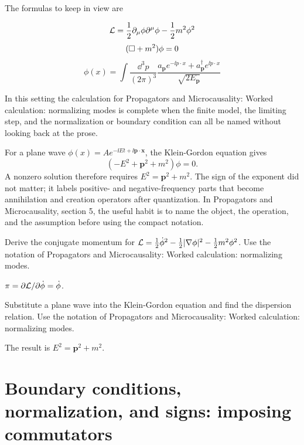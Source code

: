 The formulas to keep in view are

\[
  \mathcal L=\frac12\partial_\mu\phi\partial^\mu\phi-\frac12m^2\phi^2
\]
\[
  (\Box+m^2)\phi=0
\]
\[
  \phi(x)=\int\frac{\dd^3p}{(2\pi)^3}\frac{a_{\bm p}e^{-\ii p\cdot x}+a_{\bm p}^\dagger e^{\ii p\cdot x}}{\sqrt{2E_{\bm p}}}
\]

In this setting the calculation for Propagators and Microcausality: Worked calculation: normalizing modes is complete when the finite model, the limiting step, and the normalization or boundary condition can all be named without looking back at the prose.




\begin{example}
For a plane wave \(\phi(x)=Ae^{-\ii Et+\ii\bm p\cdot\bm x}\), the Klein-Gordon equation gives
\[
  (-E^2+\bm p^2+m^2)\phi=0.
\]
A nonzero solution therefore requires \(E^2=\bm p^2+m^2\).  The sign of the exponent did not matter; it labels positive- and negative-frequency parts that become annihilation and creation operators after quantization.  In Propagators and Microcausality, section 5, the useful habit is to name the object, the operation, and the assumption before using the compact notation.
\end{example}



\begin{exercise}
Derive the conjugate momentum for \(\mathcal L=\frac12\dot\phi^2-\frac12|\nabla\phi|^2-\frac12m^2\phi^2\).  Use the notation of Propagators and Microcausality: Worked calculation: normalizing modes.
\begin{answer}
\(\pi=\partial\mathcal L/\partial\dot\phi=\dot\phi\).
\end{answer}
\end{exercise}

\begin{exercise}
Substitute a plane wave into the Klein-Gordon equation and find the dispersion relation.  Use the notation of Propagators and Microcausality: Worked calculation: normalizing modes.
\begin{answer}
The result is \(E^2=\bm p^2+m^2\).
\end{answer}
\end{exercise}



\section{Boundary conditions, normalization, and signs: imposing commutators}

